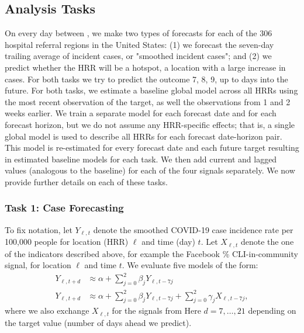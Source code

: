 \documentclass[9pt,twocolumn,twoside,lineno]{pnas-new}
\begin{document}
\subsection{Analysis Tasks}



On every day between , we make two types of
forecasts for each of the 306 hospital referral regions in the United States:
(1) we forecast the seven-day trailing average of incident cases, or "smoothed
incident cases"; and (2) we predict whether the HRR will be a hotspot, a
location with a large increase in cases. For both tasks we try to predict the
outcome 7, 8, 9, up to  days into the future. For both tasks, we
estimate a baseline global model across all HRRs using the most recent
observation of the target, as well the observations from 1 and 2 weeks earlier.
We train a separate model for each forecast date and for each forecast horizon,
but we do not assume any HRR-specific effects; that is, a single global model is
used to 
describe all HRRs for each forecast date-horizon pair. This model is
re-estimated for every forecast date and each future target resulting in
 estimated baseline models for each task.  
We then add current and lagged values (analogous to the baseline) for each of
the four signals separately. We now provide further details on each of these
tasks. 

\subsubsection{Task 1: Case Forecasting}

To fix notation, let $Y_{\ell,t}$ denote the smoothed COVID-19 case
incidence rate per 100,000 people for location (HRR) $\ell$ and time (day) $t$. 
Let $X_{\ell,t}$ denote
the one of the indicators described above, for example the Facebook \%
CLI-in-community signal, 
for location $\ell$ and time $t$.
We evaluate five models of the form:
\begin{align*}
Y_{\ell,t+d}
&\approx \alpha + \sum_{j=0}^2 \beta_j Y_{\ell,t-7j} \\
Y_{\ell,t+d}
&\approx \alpha + \sum_{j=0}^2 \beta_j Y_{\ell,t-7j} +
\sum_{j=0}^2 \gamma_j X_{\ell,t-7j}, 
\end{align*}
where we also exchange $X_{\ell, t}$ for the signals from  
Here $d=7,\ldots, 21$ depending on the target value
(number of days ahead we predict).
\end{document}
